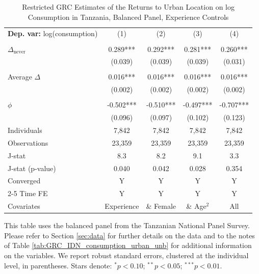 \begin{table}[htbp] \centering \begin{threeparttable}
 \caption{Restricted GRC Estimates of the Returns to Urban Location on log Consumption in Tanzania, Balanced Panel, Experience Controls} 
 \label{tab:GRC_TZA_consumption_urban_bal_exp} 
\begin{tabular}{l cccc} \toprule  \textbf{Dep. var:}  log(consumption) 
                    &\multicolumn{1}{c}{(1)}   &\multicolumn{1}{c}{(2)}   &\multicolumn{1}{c}{(3)}   &\multicolumn{1}{c}{(4)}   \\
                    &               &               &               &               \\
\addlinespace
$\Delta_{\text{never}}$&       0.289***&       0.292***&       0.281***&       0.260***\\
                    &     (0.039)   &     (0.039)   &     (0.039)   &     (0.031)   \\
                    &               &               &               &               \\
\addlinespace
Average $\Delta$    &       0.016***&       0.016***&       0.016***&       0.016***\\
                    &     (0.002)   &     (0.002)   &     (0.002)   &     (0.002)   \\
                    &               &               &               &               \\
\addlinespace
$\phi$              &      -0.502***&      -0.510***&      -0.497***&      -0.707***\\
                    &     (0.096)   &     (0.097)   &     (0.102)   &     (0.123)   \\
\addlinespace
Individuals         &       7,842   &       7,842   &       7,842   &       7,842   \\
Observations        &      23,359   &      23,359   &      23,359   &      23,359   \\
J-stat              &         8.3   &         8.2   &         9.1   &         3.3   \\
J-stat (p-value)    &       0.040   &       0.042   &       0.028   &       0.354   \\
Converged           &           Y   &           Y   &           Y   &           Y   \\
\cmidrule{2-5} Time FE & Y & Y & Y & Y \\ Covariates & Experience & \& Female & \& Age$^2$ & All \\ \bottomrule \end{tabular} \begin{tablenotes}[flushleft] \footnotesize \item{This table uses the balanced panel from the Tanzanian National Panel Survey. Please refer to Section \ref{sec:data} for further details on the data and to the notes of Table \ref{tab:GRC_IDN_consumption_urban_unb} for additional information on the variables. We report robust standard errors, clustered at the individual level, in parentheses. Stars denote: $^{*} p<0.10$; $^{**} p<0.05$; $^{***} p<0.01$.} \end{tablenotes} \end{threeparttable} \end{table}
